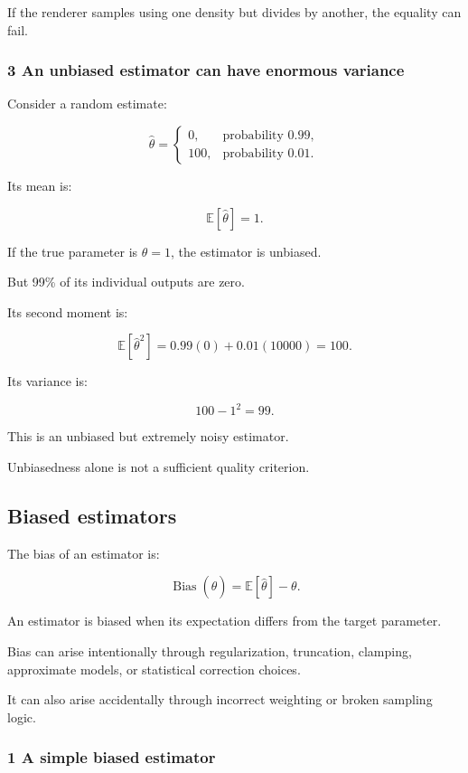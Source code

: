 If the renderer samples using one density but divides by another, the equality can fail.

\subsubsection{3 An unbiased estimator can have enormous variance}\label{02-foundations-ii-ch030-an-unbiased-estimator-can-have-enormous-variance}

Consider a random estimate:

\[
 \widehat\theta= \begin{cases} 0,&\text{probability }0.99,\\ 100,&\text{probability }0.01. \end{cases}
\]

Its mean is:

\[
 \mathbb E[\widehat\theta]=1.
\]

If the true parameter is \(\theta=1\), the estimator is unbiased.

But 99\% of its individual outputs are zero.

Its second moment is:

\[
 \mathbb E[\widehat\theta^2] = 0.99(0)+0.01(10000)=100.
\]

Its variance is:

\[
 100-1^2=\boxed{99}.
\]

This is an unbiased but extremely noisy estimator.

Unbiasedness alone is not a sufficient quality criterion.

\subsection{Biased estimators}\label{02-foundations-ii-ch030-biased-estimators}

The bias of an estimator is:

\[
 \boxed{ \operatorname{Bias}(\widehat\theta) = \mathbb E[\widehat\theta]-\theta }.
\]

An estimator is biased when its expectation differs from the target parameter.

Bias can arise intentionally through regularization, truncation, clamping, approximate models, or statistical correction choices.

It can also arise accidentally through incorrect weighting or broken sampling logic.

\subsubsection{1 A simple biased estimator}\label{02-foundations-ii-ch030-a-simple-biased-estimator}

